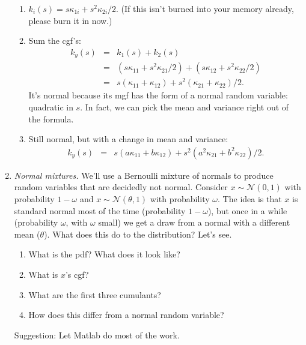 \documentclass[11pt]{article}
\begin{document}
\begin{enumerate}
\begin{enumerate}
\item $  k_i(s) = s \kappa_{1i} + s^2 \kappa_{2i}/2 $.
(If this isn't burned into your memory already, please burn it in now.)
\item Sum the cgf's:
\begin{eqnarray*}
    k_y(s) &=& k_1(s) + k_2(s) \\
            &=& (s \kappa_{11} + s^2 \kappa_{21}/2) + (s\kappa_{12} + s^2 \kappa_{22}/2) \\
            &=& s (\kappa_{11} + \kappa_{12} )
                + s^2 (\kappa_{21} + \kappa_{22})/2 .
\end{eqnarray*}
It's normal because its mgf has the form of a normal random variable:
quadratic in $s$.
In fact, we can pick the mean and variance right out of the formula.
\item Still normal, but with a change in mean and variance:
\begin{eqnarray*}
    k_y(s) &=& s (a \kappa_{11} + b \kappa_{12} )
                + s^2 (a^2 \kappa_{21} + b^2 \kappa_{22})/2  .
\end{eqnarray*}
\end{enumerate}


\item {\it Normal mixtures.\/}
We'll use a Bernoulli mixture of normals to produce
random variables that are decidedly not normal.
Consider $x \sim \mathcal{N}(0,1)$
with probability $1-\omega$
and $x \sim \mathcal{N}(\theta,1)$ with probability $\omega$.
The idea is that $x$ is standard normal most of the time (probability $1-\omega$),
but once in a while (probability $\omega$, with $\omega$ small)
we get a draw from a normal with a different mean ($\theta$).
What does this do to the distribution?
Let's see.
%
\begin{enumerate}
\item What is the pdf?  What does it look like?
\item What is $x$'s cgf?
\item What are the first three cumulants?
\item How does this differ from a normal random variable?
\end{enumerate}
Suggestion:  Let Matlab do most of the work.


\end{enumerate}
\end{document}
